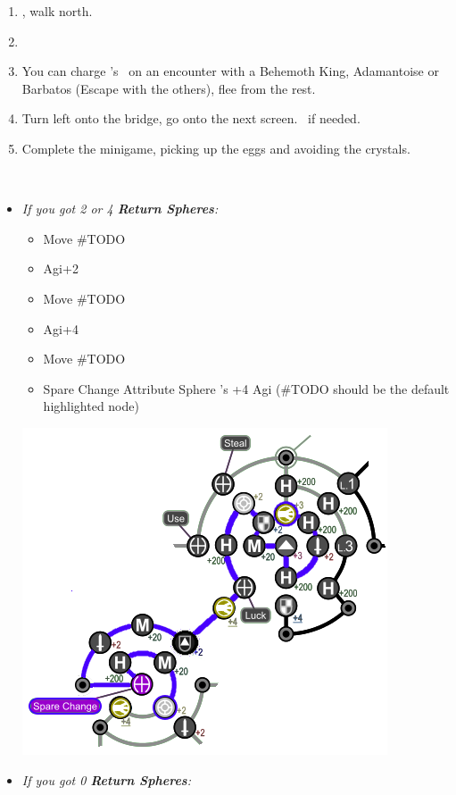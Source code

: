 \begin{enumerate}[resume]
	\item \sd, walk north.
	\item \formation{\tidus}{\kimahri}{\auron}
	\item You can charge \rikku's \od\ on an encounter with a Behemoth King, Adamantoise or Barbatos (Escape with the others), flee from the rest.
	\item Turn left onto the bridge, go onto the next screen. \save\ if needed.
	\item Complete the minigame, picking up the eggs and avoiding the crystals.
\end{enumerate}
\bothvfill\winvfill\lossvfill
\ 
\colend
\begin{spheregrid}
	\begin{multicols}{2}
		\begin{itemize}
			\item \textit{If you got 2 or 4 \textbf{Return Spheres}:}
				\begin{itemize}
					\item Move \#TODO
					\item Agi+2
					\item Move \#TODO
					\item Agi+4
					\item Move \#TODO
					\item Spare Change
					\yunaf Attribute Sphere \kimahri's +4 Agi (\#TODO should be the default highlighted node)
				\end{itemize}
				\includegraphics[width=.8\columnwidth]{graphics/4_Return_final_grid}
			\item \textit{If you got 0 \textbf{Return Spheres}:}

\end{itemize}
\end{multicols}
\end{spheregrid}
